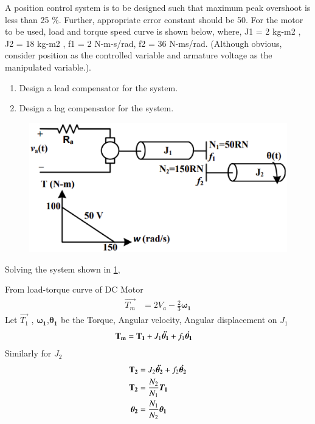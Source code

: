 \item A position control system is to be designed such that maximum peak overshoot is less than 25 \%.
Further, appropriate error constant should be 50. For the motor to be used, load and torque
speed curve is shown below, where, J1 = 2 kg-m2
, J2 = 18 kg-m2
, f1 = 2 N-m-s/rad, f2 = 36 N-ms/rad. (Although obvious, consider position as the controlled variable and armature voltage as
the manipulated variable.). 
\begin{enumerate}[label=(\roman*)]
\item Design a lead compensator for the system.
\item Design a lag compensator for the system.
\end{enumerate}

\begin{figure}[!ht]
\centering
    \includegraphics[width=\columnwidth]{./figs/ee18btech11001/ee18btech11001_1.eps}
  \caption{}
  \label{fig:ee18btech11001_fig1}
\end{figure}
%
\solution
Solving the system shown in \ref{fig:ee18btech11001_fig1},

From load-torque curve of DC Motor
\begin{align}
   \vec{T_{m}} &=  2V_{a} - \frac{2}{3}\bm{\omega_{1}}
    \label{eq:ee18btech11001_1}
\end{align}
Let $\vec{T_{1}}$ , $\bm{\omega_{1}}$,$\bm{\theta_1{}}$  be the Torque, Angular velocity, Angular displacement on $J_{1}$
\begin{align}
    \mathbf{T_{m}} &= \mathbf{T_{1}} + J_{1}\bm{\Ddot{\theta_{1}}} + f_{1}\bm{\Dot{\theta_{1}}} 
    \label{eq:ee18btech11001_2}
\end{align}
Similarly for $J_{2}$
\begin{align}
    \mathbf{T_{2}} &=  J_{2}\bm{\Ddot{\theta_{2}}} + f_{2}\bm{\Dot{\theta_{2}}} 
    \label{eq:ee18btech11001_3}
    \\
    \mathbf{T_{2}} &= \frac{N_{2}}{N_{1}} \bm{T_{1}} \label{eq:ee18btech11001_4}
    \\
    \bm{\theta_{2}} &= \frac{N_{1}}{N_{2}} \bm{\theta_{1}} \label{eq:ee18btech11001_5}
\end{align}
    
